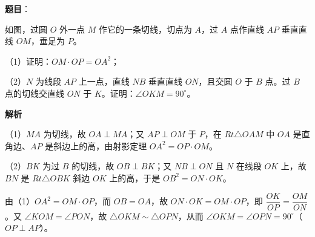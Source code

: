 \begin{answer}

\textbf{题目}：

如图，过圆 $O$ 外一点 $M$ 作它的一条切线，切点为 $A$，过 $A$ 点作直线 $AP$ 垂直直线 $OM$，垂足为 $P$。

（1）证明：$OM\cdot OP=OA^2$；

（2）$N$ 为线段 $AP$ 上一点，直线 $NB$ 垂直直线 $ON$，且交圆 $O$ 于 $B$ 点。过 $B$ 点的切线交直线 $ON$ 于 $K$。证明：$\angle OKM=90^\circ$。
\nopagebreak[4]
\begin{center}\end{center}
\nopagebreak[4]
\textbf{解析}

（1）$MA$ 为切线，故 $OA\perp MA$；又 $AP\perp OM$ 于 $P$，在 $Rt\triangle OAM$ 中 $OA$ 是直角边、$AP$ 是斜边上的高，由射影定理 $OA^2=OP\cdot OM$。

（2）$BK$ 为过 $B$ 的切线，故 $OB\perp BK$；又 $NB\perp ON$ 且 $N$ 在线段 $OK$ 上，故 $BN$ 是 $Rt\triangle OBK$ 斜边 $OK$ 上的高，于是 $OB^2=ON\cdot OK$。

由（1）$OA^2=OM\cdot OP$，而 $OB=OA$，故 $ON\cdot OK=OM\cdot OP$，即 $\dfrac{OK}{OP}=\dfrac{OM}{ON}$。又 $\angle KOM=\angle PON$，故 $\triangle OKM\sim\triangle OPN$，从而 $\angle OKM=\angle OPN=90^\circ$（$OP\perp AP$）。


\end{answer}
